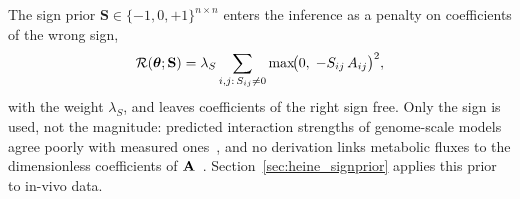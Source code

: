 The sign prior $\mathbf S\in\{-1,0,+1\}^{n\times n}$ enters the inference as a
penalty on coefficients of the wrong sign,
\begin{equation}
  \mathcal{R}(\boldsymbol{\theta}; \mathbf{S}) = \lambda_S \sum_{i,j:\, S_{ij}\neq 0}
  \max\!\bigl(0,\; -S_{ij}\,A_{ij}\bigr)^2,
\end{equation}
with the weight $\lambda_S$, and leaves coefficients of the right sign free. Only the sign is used, not the
magnitude: predicted interaction strengths of genome-scale models agree poorly
with measured ones~\cite{Rath2024GEMReliability}, and no derivation links metabolic
fluxes to the dimensionless coefficients of $\mathbf{A}$~\cite{Marsland2020MiCRM, Mustri2025GLVABreakdown}.
Section~\ref{sec:heine_signprior} applies this prior to in-vivo data.
